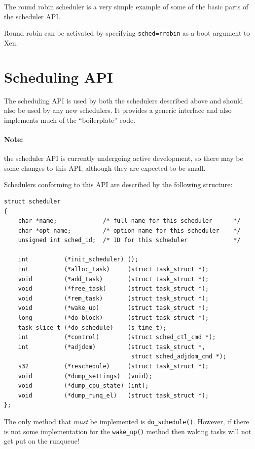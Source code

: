 \documentclass[11pt,twoside,final,openright]{xenstyle}
\begin{document}
The round robin scheduler is a very simple example of some of the basic parts
of the scheduler API.

Round robin can be activated by specifying {\tt sched=rrobin} as a boot
argument to Xen.

\section{Scheduling API}

The scheduling API is used by both the schedulers described above and should
also be used by any new schedulers.  It provides a generic interface and also
implements much of the ``boilerplate'' code.

\paragraph*{Note:} the scheduler API is currently undergoing active development,
so there may be some changes to this API, although they are expected to be small.

Schedulers conforming to this API are described by the following
structure:

\begin{verbatim}
struct scheduler
{
    char *name;             /* full name for this scheduler      */
    char *opt_name;         /* option name for this scheduler    */
    unsigned int sched_id;  /* ID for this scheduler             */

    int          (*init_scheduler) ();
    int          (*alloc_task)     (struct task_struct *);
    void         (*add_task)       (struct task_struct *);
    void         (*free_task)      (struct task_struct *);
    void         (*rem_task)       (struct task_struct *);
    void         (*wake_up)        (struct task_struct *);
    long         (*do_block)       (struct task_struct *);
    task_slice_t (*do_schedule)    (s_time_t);
    int          (*control)        (struct sched_ctl_cmd *);
    int          (*adjdom)         (struct task_struct *,
                                    struct sched_adjdom_cmd *);
    s32          (*reschedule)     (struct task_struct *);
    void         (*dump_settings)  (void);
    void         (*dump_cpu_state) (int);
    void         (*dump_runq_el)   (struct task_struct *);
};
\end{verbatim}

The only method that {\em must} be implemented is
{\tt do\_schedule()}.  However, if there is not some implementation for the
{\tt wake\_up()} method then waking tasks will not get put on the runqueue!
\end{document}
